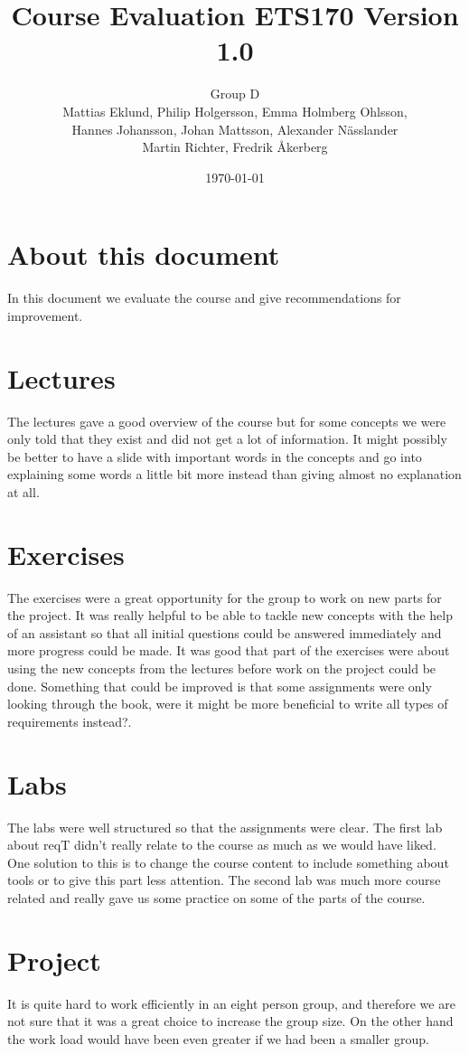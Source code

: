 \documentclass[a4paper]{article}
\title{Course Evaluation ETS170 Version 1.0}
\author{Group D\\ Mattias Eklund, Philip Holgersson, Emma Holmberg Ohlsson,\\ Hannes Johansson, Johan Mattsson, Alexander Nässlander\\Martin Richter, Fredrik Åkerberg}
\date{\today}
\begin{document}
	\maketitle
	\thispagestyle{empty}
	\setcounter{page}{0}
	\pagebreak
	\tableofcontents
	\pagebreak
	
	\section{About this document}
	In this document we evaluate the course and give recommendations for improvement.
	
	\section{Lectures}
	The lectures gave a good overview of the course but for some concepts we were only told that they exist and did not get a lot of information. It might possibly be better to have a slide with important words in the concepts and go into explaining some words a little bit more instead than giving almost no explanation at all.

	\section{Exercises}
	The exercises were a great opportunity for the group to work on new parts for the project. It was really helpful to be able to tackle new concepts with the help of an assistant so that all initial questions could be answered immediately and more progress could be made.
	It was good that part of the exercises were about using the new concepts from the lectures before work on the project could be done.
	Something that could be improved is that some assignments were only looking through the book, were it might be more beneficial to write all types of requirements instead?.

	\section{Labs}
	The labs were well structured so that the assignments were clear. The first lab about reqT didn't really relate to the course as much as we would have liked. One solution to this is to change the course content to include something about tools or to give this part less attention. The second lab was much more course related and really gave us some practice on some of the parts of the course.

	\section{Project}
	It is quite hard to work efficiently in an eight person group, and therefore we are not sure that it was a great choice to increase the group size. On the other hand the work load would have been even greater if we had been a smaller group.
	
\end{document}
